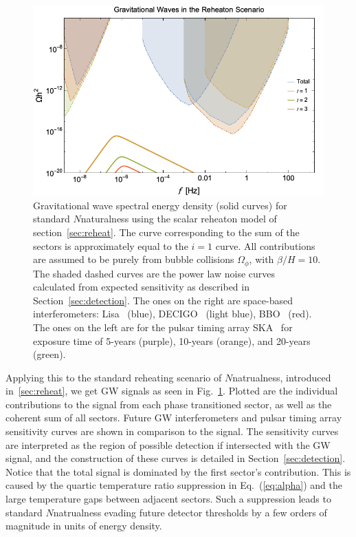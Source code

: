 \documentclass[nofootinbib,twocolumn,preprintnumbers]{revtex4-1}
\begin{document}
\begin{figure}[h!]
\centering
\includegraphics[scale=.3]{Nnatral.png} 
\caption{ Gravitational wave spectral energy density (solid curves) for standard $N$naturalness using the scalar reheaton model of section~\ref{sec:reheat}. The curve corresponding to the sum of the sectors is approximately equal to the $i=1$ curve. All contributions are assumed to be purely from bubble collisions $\Omega_{\phi}$, with $\beta/H  = 10$.  The shaded dashed curves are the power law noise curves~\cite{PhysRevD.88.124032} calculated from expected sensitivity as described in Section~\ref{sec:detection}. The ones on the right are space-based interferometers: Lisa~\citep{Audley:2017drz} (blue), DECIGO~\citep{10.1093/ptep/pty078} (light blue), BBO~\citep{PhysRevD.72.083005} (red). The ones on the left are for the pulsar timing array SKA~\cite{Janssen:2014dka} for exposure time of 5-years (purple), 10-years (orange), and 20-years (green). }
\label{fig::Nnatural}
\end{figure}
Applying this to the standard reheating scenario of $N$natrualness, introduced in~\ref{sec:reheat}, we get GW signals as seen in Fig.~\ref{fig::Nnatural}. Plotted are the individual contributions to the signal from each phase transitioned sector, as well as the coherent sum of all sectors. Future GW interferometers and pulsar timing array sensitivity curves are shown in comparison to the signal. The sensitivity curves are interpreted as the region of possible detection if intersected with the GW signal, and the construction of these curves is detailed in Section~\ref{sec:detection}. Notice that the total signal is dominated by the first sector's contribution. This is caused by the quartic temperature ratio suppression in Eq.~(\ref{eq:alpha}) and the large temperature gaps between adjacent sectors. Such a suppression leads to standard $N$natrualness evading future detector thresholds by a few orders of magnitude in units of energy density. 
\end{document}
